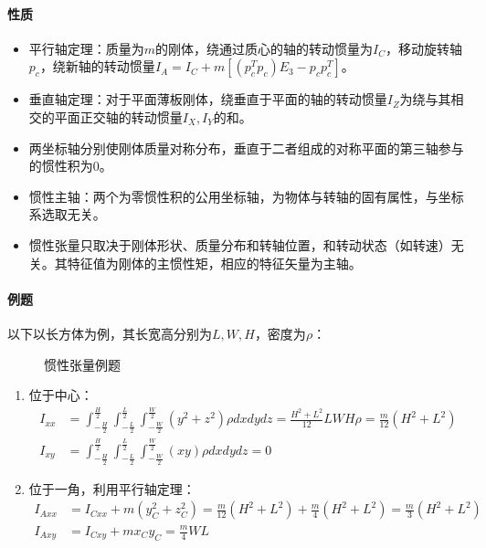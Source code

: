\documentclass[
12pt, %
a4paper, 
oneside, %
headinclude,footinclude, %
]{scrartcl}
\begin{document}
\paragraph{性质}
\begin{itemize}
\item 平行轴定理：质量为$ m $的刚体，绕通过质心的轴的转动惯量为$ I_C $，移动旋转轴$ p_c $，绕新轴的转动惯量$ I_A = I_C + m[(p_c^Tp_c)E_3 - p_cp_c^T] $。
\item 垂直轴定理：对于平面薄板刚体，绕垂直于平面的轴的转动惯量$ I_Z $为绕与其相交的平面正交轴的转动惯量$ I_X,I_Y $的和。
\item 两坐标轴分别使刚体质量对称分布，垂直于二者组成的对称平面的第三轴参与的惯性积为$ 0 $。
\item 惯性主轴：两个为零惯性积的公用坐标轴，为物体与转轴的固有属性，与坐标系选取无关。
\item 惯性张量只取决于刚体形状、质量分布和转轴位置，和转动状态（如转速）无关。其特征值为刚体的主惯性矩，相应的特征矢量为主轴。
\end{itemize}
\paragraph{例题}
{\footnotesize
以下以长方体为例，其长宽高分别为$ L,W,H $，密度为$ \rho $：

\begin{figure}[H]
\centering
\subfloat[位于中心]{\texttt{[image: 6.1]}} \quad
\subfloat[位于一角]{\texttt{[image: 6.2]}}
\caption[惯性张量例题]{惯性张量例题}
\end{figure}

\begin{enumerate}
\item 位于中心：
\begin{align*}
I_{xx} &= \int_{-\frac{H}{2}}^{\frac{H}{2}} \int_{-\frac{L}{2}}^{\frac{L}{2}} \int_{-\frac{W}{2}}^{\frac{W}{2}} (y^2 + z^2)\rho dxdydz = \frac{H^2 + L^2}{12} LWH\rho = \frac{m}{12}(H^2 + L^2) \\
I_{xy} &= \int_{-\frac{H}{2}}^{\frac{H}{2}} \int_{-\frac{L}{2}}^{\frac{L}{2}} \int_{-\frac{W}{2}}^{\frac{W}{2}} (xy)\rho dxdydz = 0
\end{align*}
\item 位于一角，利用平行轴定理：
\begin{align*}
I_{Axx} &= I_{Cxx} + m(y_C^2 + z_C^2) = \frac{m}{12}(H^2 + L^2) + \frac{m}{4}(H^2 + L^2) = \frac{m}{3}(H^2 + L^2) \\
I_{Axy} &= I_{Cxy} + m x_C y_C = \frac{m}{4}WL
\end{align*}
\end{enumerate}
}
\end{document}
